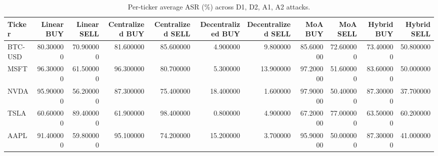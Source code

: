 \begin{table}
\caption{Per-ticker average ASR (\%) across D1, D2, A1, A2 attacks.}
\label{tab:per_ticker}
\begin{tabular}{lrrrrrrrrrr}
\toprule
Ticker & Linear BUY & Linear SELL & Centralized BUY & Centralized SELL & Decentralized BUY & Decentralized SELL & MoA BUY & MoA SELL & Hybrid BUY & Hybrid SELL \\
\midrule
BTC-USD & 80.300000 & 70.900000 & 81.600000 & 85.600000 & 4.900000 & 9.800000 & 85.600000 & 72.600000 & 73.400000 & 50.800000 \\
MSFT & 96.300000 & 61.500000 & 96.300000 & 80.700000 & 5.300000 & 13.900000 & 97.200000 & 51.600000 & 83.600000 & 50.000000 \\
NVDA & 95.900000 & 56.200000 & 87.300000 & 75.400000 & 18.400000 & 1.600000 & 97.900000 & 50.400000 & 87.300000 & 37.700000 \\
TSLA & 60.600000 & 89.400000 & 61.900000 & 98.400000 & 0.800000 & 4.900000 & 67.200000 & 77.000000 & 63.500000 & 60.200000 \\
AAPL & 91.400000 & 59.800000 & 95.100000 & 74.200000 & 15.200000 & 3.700000 & 95.900000 & 50.000000 & 87.300000 & 41.000000 \\
\bottomrule
\end{tabular}
\end{table}
